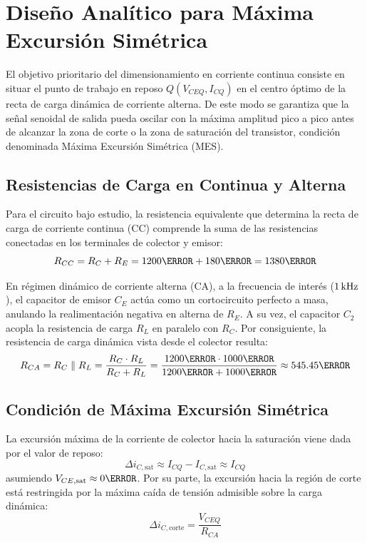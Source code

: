 \chapter{Diseño Analítico para Máxima Excursión Simétrica}
\label{chap:diseno_teorico}

El objetivo prioritario del dimensionamiento en corriente continua consiste en situar el punto de trabajo en
reposo $Q(V_{CEQ}, I_{CQ})$ en el centro óptimo de la recta de carga dinámica de corriente alterna. De este modo se
garantiza que la señal senoidal de salida pueda oscilar con la máxima amplitud pico a pico antes de alcanzar la zona
de corte o la zona de saturación del transistor, condición denominada Máxima Excursión Simétrica (MES).

\section{Resistencias de Carga en Continua y Alterna}

Para el circuito bajo estudio, la resistencia equivalente que determina la recta de carga de corriente continua (CC)
comprende la suma de las resistencias conectadas en los terminales de colector y emisor:
\begin{equation}
  R_{CC} = R_C + R_E = 1200\ohm + 180\ohm = 1380\ohm
  \label{eq:Rcc}
\end{equation}

En régimen dinámico de corriente alterna (CA), a la frecuencia de interés ($1\,\mathrm{kHz}$), el capacitor de emisor $C_E$ actúa
como un cortocircuito perfecto a masa, anulando la realimentación negativa en alterna de $R_E$. A su vez, el capacitor
$C_2$ acopla la resistencia de carga $R_L$ en paralelo con $R_C$. Por consiguiente, la resistencia de carga dinámica
vista desde el colector resulta:
\begin{equation}
  R_{CA} = R_C \parallel R_L = \frac{R_C \cdot R_L}{R_C + R_L} = \frac{1200\ohm \cdot 1000\ohm}{1200\ohm + 1000\ohm} \approx 545.45\ohm
  \label{eq:Rca}
\end{equation}

\section{Condición de Máxima Excursión Simétrica}

La excursión máxima de la corriente de colector hacia la saturación viene dada por el valor de reposo:
\begin{equation}
  \Delta i_{C,\text{sat}} \approx I_{CQ} - I_{C,\text{sat}} \approx I_{CQ}
\end{equation}
asumiendo $V_{CE,\text{sat}} \approx 0\V$. Por su parte, la excursión hacia la región de corte está restringida por la
máxima caída de tensión admisible sobre la carga dinámica:
\begin{equation}
  \Delta i_{C,\text{corte}} = \frac{V_{CEQ}}{R_{CA}}
\end{equation}

